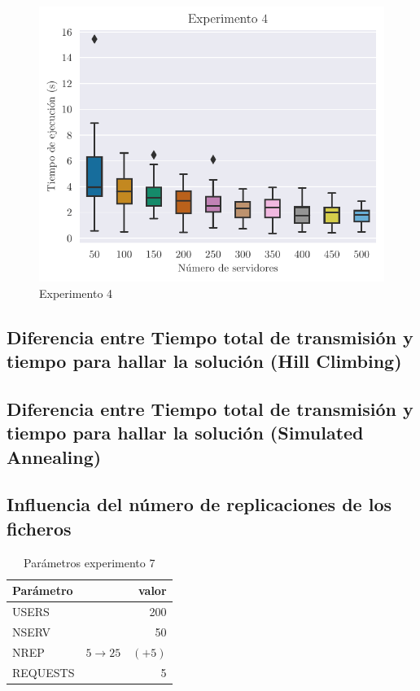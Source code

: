 \begin{figure}[H]
    \centering
    \includegraphics{include/plots/ex4_s_time_bplot_cut.pdf}
    \caption{Experimento 4}%
    \label{fig:ex4s}
\end{figure}

\subsection{Diferencia entre Tiempo total de transmisión y tiempo para hallar la solución (Hill Climbing)}

\subsection{Diferencia entre Tiempo total de transmisión y tiempo para hallar la solución (Simulated Annealing)}

\subsection{Influencia del número de replicaciones de los ficheros}

\begin{table}[H]
    \caption{Parámetros experimento 7}%
    \label{tab:ex7_par}
    \begin{center}
    \begin{tabular}{lr}
    \toprule
    Parámetro & valor \\
    \midrule
    USERS & 200 \\
    NSERV & 50 \\
    NREP & $5 \to 25 \quad (+5)$ \\
    REQUESTS & 5\\
    \bottomrule
    \end{tabular}
    \end{center}
\end{table}

